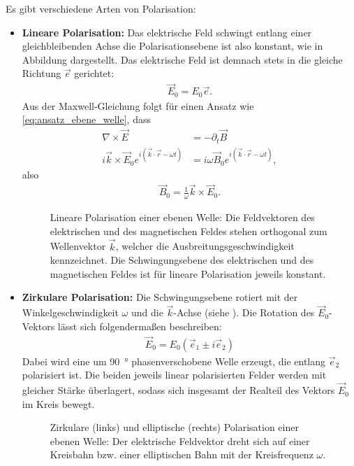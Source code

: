 Es gibt verschiedene Arten von Polarisation:
\begin{itemize}
    \item \textbf{Lineare Polarisation:} Das elektrische Feld schwingt entlang einer gleichbleibenden Achse \textendash{} die Polarisationsebene ist also konstant, wie in Abbildung  dargestellt. Das elektrische Feld ist demnach stets in die gleiche Richtung $\vec e$ gerichtet:
          \begin{align*}
              \vec E_0 = E_0 \vec e.
          \end{align*}
          Aus der Maxwell-Gleichung folgt für einen Ansatz wie \eqref{eq:ansatz_ebene_welle}, dass
          \begin{align*}
              \nabla\times\vec E                                         & = -\partial_t\vec B                                   \\
              i\vec k \times \vec E_0 e^{i(\vec k\cdot \vec r-\omega t)} & = i\omega\vec B_0 e^{i(\vec k\cdot \vec r-\omega t)},\end{align*}
          also
          \begin{align}
              \label{eq:b_feld_aus_e_feld}
              \boxed{\vec B_0 = \frac{1}{\omega}\vec k\times \vec E_0.}
          \end{align}
          \begin{figure}[htb]
              \centering
              \tfigLinearPolarisation
              \caption{Lineare Polarisation einer ebenen Welle: Die Feldvektoren des elektrischen und des magnetischen Feldes stehen orthogonal zum Wellenvektor $\vec k$, welcher die Ausbreitungsgeschwindigkeit kennzeichnet. Die Schwingungsebene des elektrischen und des magnetischen Feldes ist für lineare Polarisation jeweils konstant. }
              \label{fig:lineare_polarisation}
          \end{figure}


    \item \textbf{Zirkulare Polarisation:} Die Schwingungsebene rotiert mit der Winkelgeschwindigkeit $\omega$ und die $\vec k$-Achse (siehe ). Die Rotation des $\vec E_0$-Vektors lässt sich folgendermaßen beschreiben:
          \begin{align*}
              \vec E_0 = E_0(\vec e_1\pm i\vec e_2)
          \end{align*}
          Dabei wird eine um \SI{90}{\degree} phasenverschobene Welle erzeugt, die entlang $\vec e_2$ polarisiert ist.
          Die beiden jeweils linear polarisierten Felder werden mit gleicher Stärke überlagert, sodass sich insgesamt der Realteil des Vektors $\vec E_0$ im Kreis bewegt.
          \begin{figure}[htb]
              \centering
              \tfigCircularPolarisation
              \caption{Zirkulare (links) und elliptische (rechts) Polarisation einer ebenen Welle: Der elektrische Feldvektor dreht sich auf einer Kreisbahn bzw. einer elliptischen Bahn mit der Kreisfrequenz $\omega$. }
              \label{fig:zirkulare_polarisation}
          \end{figure}



\end{itemize}
